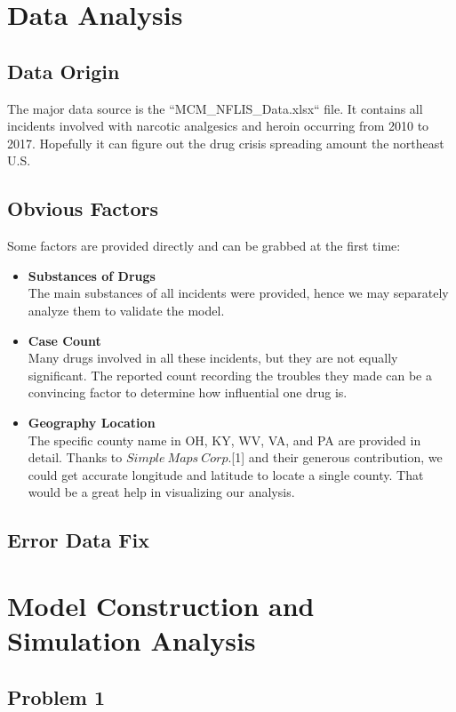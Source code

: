 \documentclass{mcmthesis}
\begin{document}
\section{Data Analysis}

\subsection{Data Origin}
The major data source is the ``MCM\_NFLIS\_Data.xlsx`` file. It contains all incidents involved with narcotic analgesics and heroin occurring from 2010 to 2017. Hopefully it can figure out the drug crisis spreading amount the northeast U.S.

\subsection{Obvious Factors}
Some factors are provided directly and can be grabbed at the first time:
\begin{itemize}
	\item \textbf{Substances of Drugs}\\
	The main substances of all incidents were provided, hence we may separately analyze them to validate the model.
	\item \textbf{Case Count}\\
	Many drugs involved in all these incidents, but they are not equally significant. The reported count recording the troubles they made can be a convincing factor to determine how influential one drug is.
	\item \textbf{Geography Location}\\
	The specific county name in OH, KY, WV, VA, and PA are provided in detail. Thanks to $Simple\ Maps\ Corp.$[1] and their generous contribution, we could get accurate longitude and latitude to locate a single county. That would be a great help in visualizing our analysis.
\end{itemize}

\subsection{Error Data Fix}

\section{Model Construction and Simulation Analysis}
\subsection{Problem 1}
\end{document}
